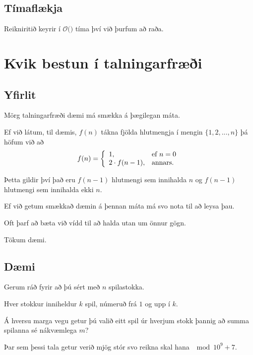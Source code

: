 \subsection{Tímaflækja}
{
    {
        \item<1-> Reikniritið keyrir í $\mathcal{O}($$)$ tíma því við þurfum að raða.
    }
}

\section{Kvik bestun í talningarfræði}
\subsection{Yfirlit}
{
    {
        \item<1-> Mörg talningarfræði dæmi má smækka á þægilegan máta.
        \item<2-> Ef við látum, til dæmis, $f(n)$ tákna fjölda hlutmengja í mengin $\{1, 2, ..., n\}$ þá höfum við að
        \[
            f(n) = \left \{
            \env{array}
            { {l l}
                1, & \text{ef $n = 0$}\\
                2 \cdot f(n - 1), & \text{annars}.
            }
            \right .
        \]
        \item<3-> Þetta gildir því það eru $f(n - 1)$ hlutmengi sem innihalda $n$ og $f(n - 1)$ hlutmengi sem innihalda ekki $n$.
        \item<4-> Ef við getum smækkað dæmin á þennan máta má svo nota  til að leysa þau.
        \item<6-> Oft þarf að bæta við vídd til að halda utan um önnur gögn.
        \item<7-> Tökum dæmi.
    }
}

\subsection{Dæmi}
{
    {
        \item<1-> Gerum ráð fyrir að þú sért með $n$ spilastokka.
        \item<2-> Hver stokkur inniheldur $k$ spil, númeruð frá $1$ og upp í $k$.
        \item<3-> Á hversu marga vegu getur þú valið eitt spil úr hverjum stokk þannig að summa spilanna sé nákvæmlega $m$?
        \item<4-> Þar sem þessi tala getur verið mjög stór svo reikna skal hana $\mod 10^9 + 7$.
    }
}

